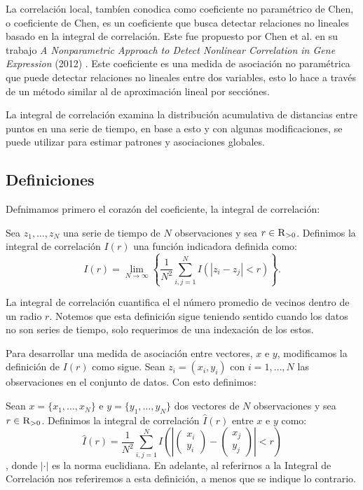 	La correlaci\'on local, tamb\'ien conodica como coeficiente no param\'etrico de Chen, o coeficiente de Chen, es un coeficiente que busca detectar relaciones no lineales basado en la integral de correlaci\'on. Este fue propuesto por Chen et al. en su trabajo \textit{A Nonparametric Approach to Detect Nonlinear Correlation in Gene Expression} (2012) \cite{Chen2012}. Este coeficiente es una medida de asociaci\'on no param\'etrica que puede detectar relaciones no lineales entre dos variables, esto lo hace a trav\'es de un m\'etodo similar al de aproximaci\'on lineal por secci\'ones. 

	La integral de correlaci\'on examina la distribuci\'on acumulativa de distancias entre puntos en una serie de tiempo, en base a esto y con algunas modificaciones, se puede utilizar para estimar patrones y asociaciones globales. 


	\subsection{Definiciones}

	Defnimamos primero el coraz\'on del coeficiente, la integral de correlaci\'on:

	\begin{defn}
		Sea $z_1,\dots,z_N$ una serie de tiempo de $N$ observaciones y sea $r\in\textsc{R}_{>0}$. Definimos la integral de correlaci\'on $I(r)$ una funci\'on indicadora definida como:
		$$
		I(r)=\lim _{N \rightarrow \infty}\left\{\frac{1}{N^{2}} \sum_{i, j=1}^{N} I\left(\left|z_{i}-z_{j}\right|<r\right)\right\}.
		$$
	\end{defn}

	La integral de correlaci\'on cuantifica el el n\'umero promedio de vecinos dentro de un radio $r$. Notemos que esta definici\'on sigue teniendo sentido cuando los datos no son series de tiempo, solo requerimos de una indexaci\'on de los estos.

	Para desarrollar una medida de asociaci\'on entre vectores, $x$ e $y$, modificamos la definici\'on de $I(r)$ como sigue. Sean $z_i=(x_i,y_i)$ con $i=1,\dots, N$ las observaciones en el conjunto de datos. Con esto definimos:

	\begin{defn}
		Sean $x= \{x_1,\dots,x_N\} $ e $y=\{y_1,\dots,y_N\}$ dos vectores de $N$ observaciones y sea $r\in\textsc{R}_{>0}$. Definimos la integral de correlaci\'on $\hat{I}(r)$ entre $x$ e $y$ como:
		$$\hat{I}(r)=\frac{1}{N^{2}} \sum_{i, j=1}^{N} I\left(\left|\begin{pmatrix}
			x_{i} \\
			y_{i}
		  \end{pmatrix}-\begin{pmatrix}
			x_{j} \\
			y_{j}
		  \end{pmatrix}\right|<r\right)$$,
		donde $|\cdot|$ es la norma euclidiana. En adelante, al referirnos a la Integral de Correlaci\'on nos referiremos a esta definici\'on, a menos que se indique lo contrario.

	\end{defn}
	
